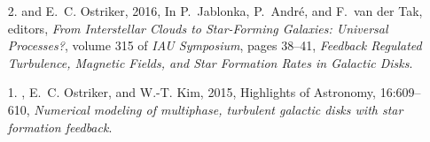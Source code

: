 \documentclass[12pt,preprint,letterpaper]{aastex63}
\begin{document}
\begin{itemize}[itemsep=1pt]
\item[2.] \boldname{} and E.~C. {Ostriker}, 2016, In P.~{Jablonka},
  P.~{Andr{\'e}}, and F.~{van der Tak}, editors, {\em From Interstellar Clouds
  to Star-Forming Galaxies: Universal Processes?}, volume 315 of {\em IAU
  Symposium}, pages 38--41, \emph{{Feedback Regulated Turbulence, Magnetic
  Fields, and Star Formation Rates in Galactic Disks}}.
\item[1.] \boldname{}, E.~C. {Ostriker}, and W.-T. {Kim}, 2015,
  Highlights of Astronomy, 16:609--610, \emph{{Numerical modeling
  of multiphase, turbulent galactic disks with star formation feedback}}.
\end{itemize}



\end{document}
